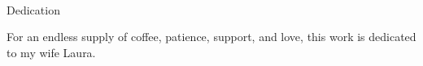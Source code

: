 
\renewcommand{\baselinestretch}{2}
\small\normalsize
\hbox{\ }
 
\vspace{-.65in}

\begin{center}
\large{Dedication}
\end{center} 

For an endless supply of coffee, patience, support, and love, this work is dedicated to my wife Laura.
